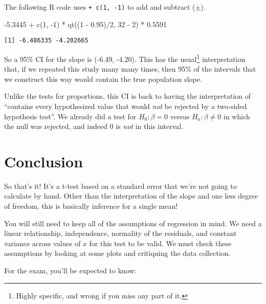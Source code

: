 \documentclass[
  letterpaper,
  DIV=11,
  numbers=noendperiod]{scrreprt}
\newenvironment{Shaded}{\begin{snugshade}}{\end{snugshade}}
\newcommand{\DecValTok}[1]{\textcolor[rgb]{0.68,0.00,0.00}{#1}}
\newcommand{\FloatTok}[1]{\textcolor[rgb]{0.68,0.00,0.00}{#1}}
\newcommand{\FunctionTok}[1]{\textcolor[rgb]{0.28,0.35,0.67}{#1}}
\newcommand{\NormalTok}[1]{\textcolor[rgb]{0.00,0.23,0.31}{#1}}
\newcommand{\SpecialCharTok}[1]{\textcolor[rgb]{0.37,0.37,0.37}{#1}}
\begin{document}
The following R code uses \texttt{+\ c(1,\ -1)} to add and subtract
(\(\pm\)).

\begin{Shaded}
\begin{Highlighting}[]
\SpecialCharTok{{-}}\FloatTok{5.3445} \SpecialCharTok{+} \FunctionTok{c}\NormalTok{(}\DecValTok{1}\NormalTok{, }\SpecialCharTok{{-}}\DecValTok{1}\NormalTok{) }\SpecialCharTok{*} \FunctionTok{qt}\NormalTok{((}\DecValTok{1} \SpecialCharTok{{-}} \FloatTok{0.95}\NormalTok{)}\SpecialCharTok{/}\DecValTok{2}\NormalTok{, }\DecValTok{32} \SpecialCharTok{{-}} \DecValTok{2}\NormalTok{) }\SpecialCharTok{*} \FloatTok{0.5591}
\end{Highlighting}
\end{Shaded}

\begin{verbatim}
[1] -6.486335 -4.202665
\end{verbatim}

So a 95\% CI for the slope is (-6.49, -4.20). This has the
usual\footnote{Highly specific, and wrong if you miss any part of it.}
interpretation that, if we repeated this study many many times, then
95\% of the intervals that we construct this way would contain the true
population slope.

Unlike the tests for proportions, this CI is back to having the
interpretation of ``contains every hypothesized value that would
\emph{not} be rejected by a two-sided hypothesis test''. We already did
a test for \(H_0:\beta = 0\) versus \(H_a:\beta \ne 0\) in which the
null was rejected, and indeed 0 is \emph{not} in this interval.

\hypertarget{conclusion-2}{%
\section{Conclusion}\label{conclusion-2}}

So that's it! It's a t-test based on a standard error that we're not
going to calculate by hand. Other than the interpretation of the slope
and one less degree of freedom, this is basically inference for a single
mean!

You will still need to keep all of the assumptions of regression in
mind. We need a linear relationship, independence, normality of the
residuals, and constant variance across values of \(x\) for this test to
be valid. We must check these assumptions by looking at some plots and
critiquing the data collection.

For the exam, you'll be expected to know:
\end{document}
